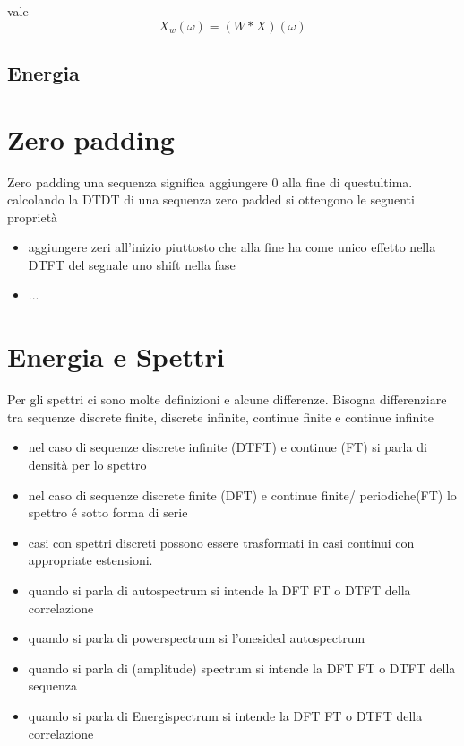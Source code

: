 \documentclass[11pt,a4paper,DIV12,BCOR1.5mm]{scrartcl}
\begin{document}
 
 vale 
  \begin{equation}
  X_w (\omega) = (W \ast X) (\omega)
  \end{equation}
  
  \subsection{Energia}
  
  
 
 
 
 
\section{Zero padding}
Zero padding una sequenza significa aggiungere 0 alla fine di questultima. calcolando la DTDT di una sequenza zero padded si ottengono le seguenti proprietà

\begin{itemize}
\item aggiungere zeri  all'inizio piuttosto che alla fine ha come unico effetto nella DTFT del segnale uno shift nella fase
\item ...
\end{itemize}

\section{Energia e Spettri}
Per gli spettri ci sono molte definizioni e alcune differenze. Bisogna differenziare tra sequenze  discrete finite, discrete infinite, continue finite e continue infinite
\begin{itemize}
	\item  nel caso di sequenze discrete infinite (DTFT) e continue (FT) si parla di densità per lo spettro 
	\item   nel caso di sequenze discrete finite (DFT) e continue  finite/ periodiche(FT) lo spettro é sotto forma di serie
	\item casi con spettri discreti possono essere trasformati in casi continui con appropriate estensioni.
	\item  quando si parla di autospectrum si intende la DFT FT o DTFT della correlazione
	
	\item  quando si parla di powerspectrum si l'onesided autospectrum
	
	\item  quando si parla di (amplitude) spectrum si intende la DFT FT o DTFT della sequenza
	\item  quando si parla di Energispectrum si intende la DFT FT o DTFT della correlazione
	
\end{itemize} 
\end{document}
